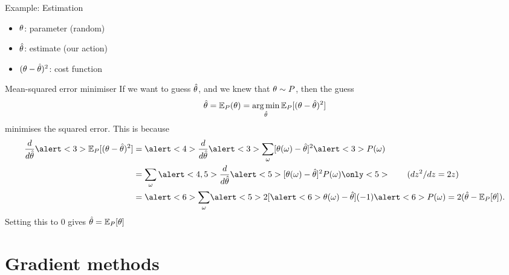 \documentclass[smaller]{beamer}
\begin{document}
\begin{frame}[label={sec:org6b50527}]{Example: Estimation}
\begin{itemize}
\item \(\theta\): \alert{parameter} (random)
\item \(\hat{\theta}\): \alert{estimate} (our action)
\item \((\theta - \hat{\theta})^2\): \alert{cost} function
\end{itemize}
\pause
\begin{block}{Mean-squared error minimiser}
If we want to guess \(\hat{\theta}\), and we knew that \(\theta \sim P\), then the guess
\[
\hat{\theta} = \mathop{\mbox{\ensuremath{\mathbb{E}}}}\nolimits_P(\theta) = \operatorname*{arg\,min}_{\hat{\theta}} \mathop{\mbox{\ensuremath{\mathbb{E}}}}\nolimits_P [(\theta - \hat{\theta})^2]
\]
minimises the squared error. 
\pause
This is because
\begin{align}
\frac{d}{d \hat{\theta}}
\alert<3>{\E_P} [(\param - \hat{\param})^2]
&=
\alert<4>{\frac{d}{d \hat{\theta}}}
\alert<3>{\sum_\omega} [\theta(\omega) -  \hat{\param}]^2 \alert<3>{P(\omega)}\\
&=
 \sum_\omega \alert<4,5>{\frac{d}{d \hat{\theta}}}
\alert<5>{[\theta(\omega) -  \hat{\param}]^2} P(\omega)
\only<5>{\qquad (dz^2/dz = 2z)}
\\
&=
\alert<6>{\sum_\omega} \alert<5>{2 [\alert<6>{\theta(\omega)} -  \hat{\param}] (-1)} \alert<6>{P(\omega)}
=
 2 (\hat{\param} - \E_P [\theta]).
\end{align}
Setting this to \(0\) gives \(\hat{\theta} =\mathop{\mbox{\ensuremath{\mathbb{E}}}}\nolimits_P [\theta]\)
\end{block}
\end{frame}

\section{Gradient methods}
\label{sec:org75c96f0}
\end{document}
